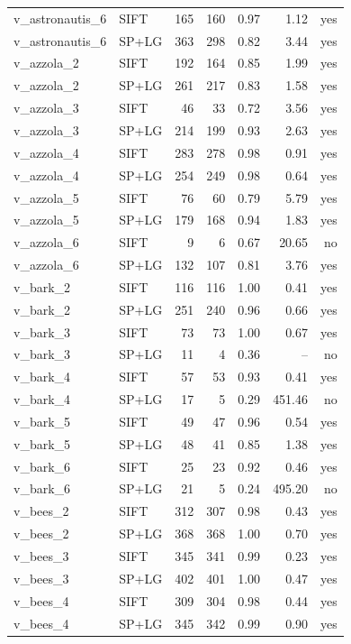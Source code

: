 \begin{longtable}{llrrrrr}
v\_astronautis\_6 & SIFT & 165 & 160 & 0.97 & 1.12 & yes \\
v\_astronautis\_6 & SP+LG & 363 & 298 & 0.82 & 3.44 & yes \\
v\_azzola\_2 & SIFT & 192 & 164 & 0.85 & 1.99 & yes \\
v\_azzola\_2 & SP+LG & 261 & 217 & 0.83 & 1.58 & yes \\
v\_azzola\_3 & SIFT & 46 & 33 & 0.72 & 3.56 & yes \\
v\_azzola\_3 & SP+LG & 214 & 199 & 0.93 & 2.63 & yes \\
v\_azzola\_4 & SIFT & 283 & 278 & 0.98 & 0.91 & yes \\
v\_azzola\_4 & SP+LG & 254 & 249 & 0.98 & 0.64 & yes \\
v\_azzola\_5 & SIFT & 76 & 60 & 0.79 & 5.79 & yes \\
v\_azzola\_5 & SP+LG & 179 & 168 & 0.94 & 1.83 & yes \\
v\_azzola\_6 & SIFT & 9 & 6 & 0.67 & 20.65 & no \\
v\_azzola\_6 & SP+LG & 132 & 107 & 0.81 & 3.76 & yes \\
v\_bark\_2 & SIFT & 116 & 116 & 1.00 & 0.41 & yes \\
v\_bark\_2 & SP+LG & 251 & 240 & 0.96 & 0.66 & yes \\
v\_bark\_3 & SIFT & 73 & 73 & 1.00 & 0.67 & yes \\
v\_bark\_3 & SP+LG & 11 & 4 & 0.36 & -- & no \\
v\_bark\_4 & SIFT & 57 & 53 & 0.93 & 0.41 & yes \\
v\_bark\_4 & SP+LG & 17 & 5 & 0.29 & 451.46 & no \\
v\_bark\_5 & SIFT & 49 & 47 & 0.96 & 0.54 & yes \\
v\_bark\_5 & SP+LG & 48 & 41 & 0.85 & 1.38 & yes \\
v\_bark\_6 & SIFT & 25 & 23 & 0.92 & 0.46 & yes \\
v\_bark\_6 & SP+LG & 21 & 5 & 0.24 & 495.20 & no \\
v\_bees\_2 & SIFT & 312 & 307 & 0.98 & 0.43 & yes \\
v\_bees\_2 & SP+LG & 368 & 368 & 1.00 & 0.70 & yes \\
v\_bees\_3 & SIFT & 345 & 341 & 0.99 & 0.23 & yes \\
v\_bees\_3 & SP+LG & 402 & 401 & 1.00 & 0.47 & yes \\
v\_bees\_4 & SIFT & 309 & 304 & 0.98 & 0.44 & yes \\
v\_bees\_4 & SP+LG & 345 & 342 & 0.99 & 0.90 & yes \\

\end{longtable}
